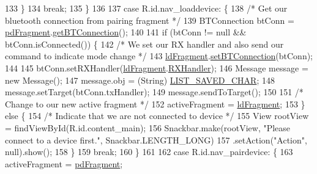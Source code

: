 \begin{DoxyCode}
133                 \}
134                 \textcolor{keywordflow}{break};
135             \}
136 
137             \textcolor{keywordflow}{case} R.id.nav\_loaddevice: \{
138                 \textcolor{comment}{/* Get our bluetooth connection from pairing fragment */}
139                 BTConnection btConn = \hyperlink{classcom_1_1jack_1_1motorbikestatistics_1_1_main_activity_a2802ad16b5fdba42834d1b31e255dd96}{pdFragment}.\hyperlink{classcom_1_1jack_1_1motorbikestatistics_1_1_pair_device_fragment_a32debe1358d94bb1c972137f60d1aa36}{getBTConnection}();
140 
141                 \textcolor{keywordflow}{if} (btConn != null && btConn.isConnected()) \{
142                     \textcolor{comment}{/* We set our RX handler and also send our command to indicate mode change */}
143                     \hyperlink{classcom_1_1jack_1_1motorbikestatistics_1_1_main_activity_ac2ac0c852d3352efd6368ee550ef3c3c}{ldFragment}.\hyperlink{classcom_1_1jack_1_1motorbikestatistics_1_1_load_device_fragment_aec66dc5fd944098de78ace4175fca5b6}{setBTConnection}(btConn);
144 
145                     btConn.setRXHandler(\hyperlink{classcom_1_1jack_1_1motorbikestatistics_1_1_main_activity_ac2ac0c852d3352efd6368ee550ef3c3c}{ldFragment}.\hyperlink{classcom_1_1jack_1_1motorbikestatistics_1_1_load_device_fragment_a7c26c8686c290d8766b051f31473d716}{RXHandler});
146                     Message message = \textcolor{keyword}{new} Message();
147                     message.obj = (String) \hyperlink{classcom_1_1jack_1_1motorbikestatistics_1_1_main_activity_a853e8df63cac245f60ef82edaaa7ee31}{LIST\_SAVED\_CHAR};
148                     message.setTarget(btConn.txHandler);
149                     message.sendToTarget();
150 
151                     \textcolor{comment}{/* Change to our new active fragment */}
152                     activeFragment = \hyperlink{classcom_1_1jack_1_1motorbikestatistics_1_1_main_activity_ac2ac0c852d3352efd6368ee550ef3c3c}{ldFragment};
153                 \} \textcolor{keywordflow}{else} \{
154                     \textcolor{comment}{/* Indicate that we are not connected to device */}
155                     View rootView = findViewById(R.id.content\_main);
156                     Snackbar.make(rootView, \textcolor{stringliteral}{"Please connect to a device first."}, Snackbar.LENGTH\_LONG)
157                             .setAction(\textcolor{stringliteral}{"Action"}, null).show();
158                 \}
159                 \textcolor{keywordflow}{break};
160             \}
161 
162             \textcolor{keywordflow}{case} R.id.nav\_pairdevice: \{
163                 activeFragment = \hyperlink{classcom_1_1jack_1_1motorbikestatistics_1_1_main_activity_a2802ad16b5fdba42834d1b31e255dd96}{pdFragment};

\end{DoxyCode}
